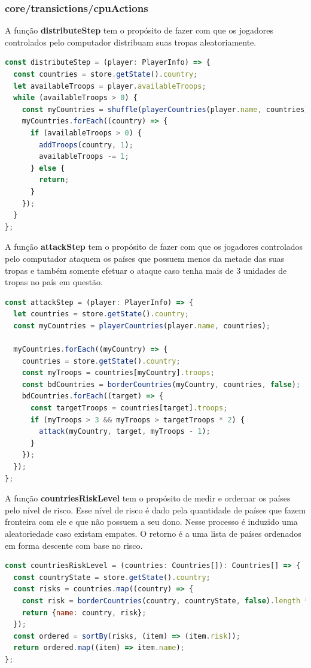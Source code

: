 \documentclass[rel_mlp]{iiufrgs}
\begin{document}
\subsubsection{core/transictions/cpuActions}

A função \textbf{distributeStep} tem o propósito de fazer com que os jogadores controlados pelo computador distribuam suas tropas aleatoriamente.
\begin{lstlisting}[language=JavaScript]
const distributeStep = (player: PlayerInfo) => {
  const countries = store.getState().country;
  let availableTroops = player.availableTroops;
  while (availableTroops > 0) {
    const myCountries = shuffle(playerCountries(player.name, countries));
    myCountries.forEach((country) => {
      if (availableTroops > 0) {
        addTroops(country, 1);
        availableTroops -= 1;
      } else {
        return;
      }
    });
  }
};
\end{lstlisting}

A função \textbf{attackStep} tem o propósito de fazer com que os jogadores controlados pelo computador ataquem os países que possuem menos da metade das suas tropas e também somente efetuar o ataque caso tenha mais de 3 unidades de tropas no país em questão.
\begin{lstlisting}[language=JavaScript]
const attackStep = (player: PlayerInfo) => {
  let countries = store.getState().country;
  const myCountries = playerCountries(player.name, countries);
  
  myCountries.forEach((myCountry) => {
    countries = store.getState().country;
    const myTroops = countries[myCountry].troops;
    const bdCountries = borderCountries(myCountry, countries, false);
    bdCountries.forEach((target) => {
      const targetTroops = countries[target].troops;
      if (myTroops > 3 && myTroops > targetTroops * 2) {
        attack(myCountry, target, myTroops - 1);
      }
    });
  });
};
\end{lstlisting}

A função \textbf{countriesRiskLevel} tem o propósito de medir e ordernar os países pelo nível de risco. 
Esse nível de risco é dado pela quantidade de países que fazem fronteira com ele e que não possuem a seu dono.
Nesse processo é induzido uma aleatoriedade caso existam empates.
O retorno é a uma lista de países ordenados em forma descente com base no risco.
\begin{lstlisting}[language=JavaScript]
const countriesRiskLevel = (countries: Countries[]): Countries[] => {
  const countryState = store.getState().country;
  const risks = countries.map((country) => {
    const risk = borderCountries(country, countryState, false).length * 1000 + Math.abs(Math.random() * 999);
    return {name: country, risk};
  });
  const ordered = sortBy(risks, (item) => (item.risk)); 
  return ordered.map((item) => item.name);
};
\end{lstlisting}
\end{document}
